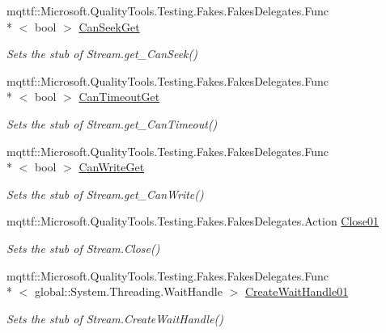 \begin{DoxyCompactItemize}
mqttf\-::\-Microsoft.\-Quality\-Tools.\-Testing.\-Fakes.\-Fakes\-Delegates.\-Func\\*
$<$ bool $>$ \hyperlink{class_system_1_1_net_1_1_security_1_1_fakes_1_1_stub_authenticated_stream_a666ef53e0b8a0456edff5806439eeade}{Can\-Seek\-Get}
\begin{DoxyCompactList}\small\item\em Sets the stub of Stream.\-get\-\_\-\-Can\-Seek()\end{DoxyCompactList}\item 
mqttf\-::\-Microsoft.\-Quality\-Tools.\-Testing.\-Fakes.\-Fakes\-Delegates.\-Func\\*
$<$ bool $>$ \hyperlink{class_system_1_1_net_1_1_security_1_1_fakes_1_1_stub_authenticated_stream_a1b2526eae471fac423b0af1a1d70055a}{Can\-Timeout\-Get}
\begin{DoxyCompactList}\small\item\em Sets the stub of Stream.\-get\-\_\-\-Can\-Timeout()\end{DoxyCompactList}\item 
mqttf\-::\-Microsoft.\-Quality\-Tools.\-Testing.\-Fakes.\-Fakes\-Delegates.\-Func\\*
$<$ bool $>$ \hyperlink{class_system_1_1_net_1_1_security_1_1_fakes_1_1_stub_authenticated_stream_ab0d6fd5e85f2a8e73c8568deaf5a1502}{Can\-Write\-Get}
\begin{DoxyCompactList}\small\item\em Sets the stub of Stream.\-get\-\_\-\-Can\-Write()\end{DoxyCompactList}\item 
mqttf\-::\-Microsoft.\-Quality\-Tools.\-Testing.\-Fakes.\-Fakes\-Delegates.\-Action \hyperlink{class_system_1_1_net_1_1_security_1_1_fakes_1_1_stub_authenticated_stream_a9f2107d55ddc053952655c4c0f25f6ea}{Close01}
\begin{DoxyCompactList}\small\item\em Sets the stub of Stream.\-Close()\end{DoxyCompactList}\item 
mqttf\-::\-Microsoft.\-Quality\-Tools.\-Testing.\-Fakes.\-Fakes\-Delegates.\-Func\\*
$<$ global\-::\-System.\-Threading.\-Wait\-Handle $>$ \hyperlink{class_system_1_1_net_1_1_security_1_1_fakes_1_1_stub_authenticated_stream_a3fc27e07b698fe6fcddc75bbc655464c}{Create\-Wait\-Handle01}
\begin{DoxyCompactList}\small\item\em Sets the stub of Stream.\-Create\-Wait\-Handle()\end{DoxyCompactList}\item 

\end{DoxyCompactItemize}

